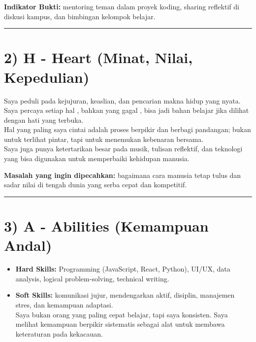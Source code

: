 \documentclass[
  letterpaper,
  DIV=11,
  numbers=noendperiod]{scrreprt}
\providecommand{\tightlist}{%
  \setlength{\itemsep}{0pt}\setlength{\parskip}{0pt}}
\begin{document}
\textbf{Indikator Bukti:} mentoring teman dalam proyek koding, sharing
reflektif di diskusi kampus, dan bimbingan kelompok belajar.

\begin{center}\rule{0.5\linewidth}{0.5pt}\end{center}

\section{2) H - Heart (Minat, Nilai,
Kepedulian)}\label{h---heart-minat-nilai-kepedulian}

Saya peduli pada kejujuran, keaslian, dan pencarian makna hidup yang
nyata. Saya percaya setiap hal , bahkan yang gagal , bisa jadi bahan
belajar jika dilihat dengan hati yang terbuka.\\
Hal yang paling saya cintai adalah proses berpikir dan berbagi
pandangan; bukan untuk terlihat pintar, tapi untuk menemukan kebenaran
bersama.\\
Saya juga punya ketertarikan besar pada musik, tulisan reflektif, dan
teknologi yang bisa digunakan untuk memperbaiki kehidupan manusia.

\textbf{Masalah yang ingin dipecahkan:} bagaimana cara manusia tetap
tulus dan sadar nilai di tengah dunia yang serba cepat dan kompetitif.

\begin{center}\rule{0.5\linewidth}{0.5pt}\end{center}

\section{3) A - Abilities (Kemampuan
Andal)}\label{a---abilities-kemampuan-andal}

\begin{itemize}
\tightlist
\item
  \textbf{Hard Skills:} Programming (JavaScript, React, Python), UI/UX,
  data analysis, logical problem-solving, technical writing.\\
\item
  \textbf{Soft Skills:} komunikasi jujur, mendengarkan aktif, disiplin,
  manajemen stres, dan kemampuan adaptasi.\\
  Saya bukan orang yang paling cepat belajar, tapi saya konsisten. Saya
  melihat kemampuan berpikir sistematis sebagai alat untuk membawa
  keteraturan pada kekacauan.
\end{itemize}
\end{document}
